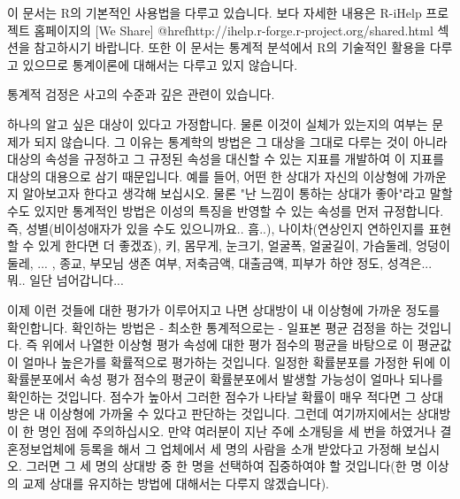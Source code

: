\documentclass{article}
\begin{document}
이 문서는 R의 기본적인 사용법을 다루고 있습니다. 보다 자세한 내용은 R-iHelp 프로젝트 홈페이지의 [We Share] @href{http://ihelp.r-forge.r-project.org/shared.html} 섹션을 참고하시기 바랍니다.
또한 이 문서는 통계적 분석에서 R의 기술적인 활용을 다루고 있으므로 통계이론에 대해서는 다루고 있지 않습니다.

통계적 검정은 사고의 수준과 깊은 관련이 있습니다.

하나의 알고 싶은 대상이 있다고 가정합니다. 물론 이것이 실체가 있는지의 여부는 문제가 되지 않습니다. 그 이유는 통계학의 방법은 그 대상을 그대로 다루는 것이 아니라 대상의 속성을 규정하고 그 규정된 속성을 대신할 수 있는 지표를 개발하여 이 지표를 대상의 대용으로 삼기 때문입니다. 예를 들어, 어떤 한 상대가 자신의 이상형에 가까운지  알아보고자 한다고 생각해 보십시오. 물론 "난 느낌이 통하는 상대가 좋아"라고 말할 수도 있지만  통계적인 방법은 이성의 특징을 반영할 수 있는 속성를 먼저 규정합니다. 즉, 성별(비이성애자가 있을 수도 있으니까요.. 흠..), 나이차(연상인지 연하인지를 표현 할 수 있게 한다면 더 좋겠죠), 키, 몸무게, 눈크기, 얼굴폭, 얼굴길이, 가슴둘레, 엉덩이둘레, ... , 종교, 부모님 생존 여부, 저축금액, 대출금액, 피부가 하얀 정도, 성격은... 뭐.. 일단 넘어갑니다... 



이제 이런 것들에 대한 평가가 이루어지고 나면 상대방이 내 이상형에 가까운 정도를 확인합니다. 확인하는  방법은 - 최소한 통계적으로는 - 일표본 평균 검정을 하는 것입니다. 즉 위에서 나열한 이상형 평가 속성에 대한 평가 점수의 평균을 바탕으로 이 평균값이 얼마나 높은가를 확률적으로 평가하는 것입니다. 일정한 확률분포를 가정한 뒤에 이 확률분포에서 속성 평가 점수의 평균이 확률분포에서 발생할 가능성이 얼마나 되나를 확인하는 것입니다. 점수가 높아서 그러한 점수가 나타날 확률이 매우 적다면 그 상대방은 내 이상형에 가까울 수 있다고 판단하는 것입니다.
그런데 여기까지에서는 상대방이 한 명인 점에 주의하십시오. 만약 여러분이 지난 주에 소개팅을 세 번을 하였거나 결혼정보업체에 등록을 해서 그 업체에서 세 명의 사람을 소개 받았다고 가정해 보십시오. 그러면 그 세 명의 상대방 중 한 명을 선택하여 집중하여야 할 것입니다(한 명 이상의 교제 상대를 유지하는 방법에 대해서는 다루지 않겠습니다). 





\end{document}
